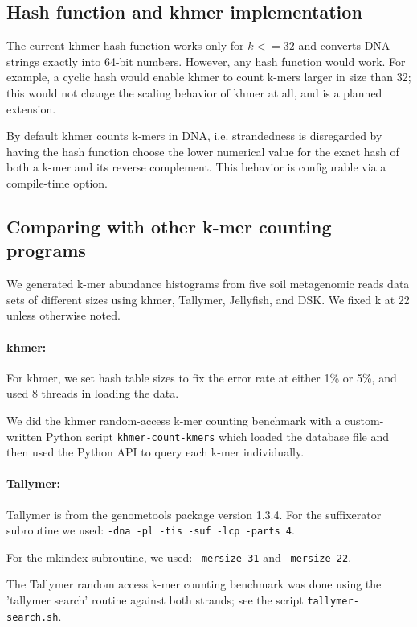 \documentclass{article}
\begin{document}
\subsection{Hash function and khmer implementation}

The current khmer hash function works only for $k <= 32$ and converts
DNA strings exactly into 64-bit numbers.  However, any hash function
would work. For example, a cyclic hash would enable khmer to count
k-mers larger in size than 32; this would not change the scaling
behavior of khmer at all, and is a planned extension.

By default khmer counts k-mers in DNA, i.e. strandedness is
disregarded by having the hash function choose the lower numerical
value for the exact hash of both a k-mer and its reverse complement.
This behavior is configurable via a compile-time option.

\subsection{Comparing with other k-mer counting programs}

We generated k-mer abundance histograms from five soil metagenomic reads
data sets of different sizes using khmer, Tallymer, Jellyfish, and DSK.
We fixed k at 22 unless otherwise noted.

\paragraph{khmer:}
For khmer, we set hash table sizes to fix the error rate at
either 1\% or 5\%, and used 8 threads in loading the data.

We did the khmer random-access k-mer counting benchmark with a
custom-written Python script {\tt khmer-count-kmers} which loaded the
database file and then used the Python API to query each k-mer
individually.

\paragraph{Tallymer:}
Tallymer is from the genometools package version 1.3.4. For the suffixerator subroutine we used:
{\tt -dna -pl -tis -suf -lcp -parts 4}.

For the mkindex subroutine, we used: {\tt -mersize 31} and {\tt -mersize 22}.

The Tallymer random access k-mer counting benchmark was done using the
'tallymer search' routine against both strands; see the script
{\tt tallymer-search.sh}.
\end{document}
